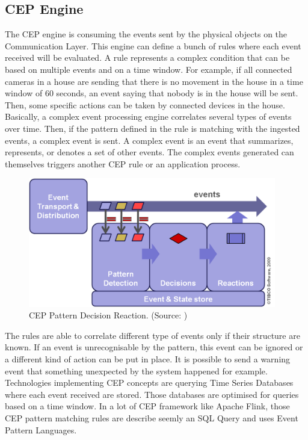 \documentclass[11pt]{article}
\begin{document}
\subsection{CEP Engine} \label{cep-engine}

The CEP engine is consuming the events sent by the physical objects on the Communication Layer. This engine can define a bunch of rules where each event received will be evaluated. A rule represents a complex condition that can be based on multiple events and on a time window. For example, if all connected cameras in a house are sending that there is no movement in the house in a time window of 60 seconds, an event saying that nobody is in the house will be sent. Then, some specific actions can be taken by connected devices in the house. Basically, a complex event processing engine correlates several types of events over time. Then, if the pattern defined in the rule is matching with the ingested events, a complex event is sent. A complex event is an event that summarizes, represents, or denotes a set of other events\cite{glossary}. The complex events generated can themselves triggers another CEP rule or an application process.
\newline
\begin{figure}[h]
	\includegraphics[width=\textwidth,height=160pt]{assets/cep-pattern-decision-reaction.png} 
	\caption[CEP Pattern Decision Reaction]{CEP Pattern Decision Reaction. (Source: \cite{cep-pattern-decision})}
	\label{fig:cep-pattern-decision-reaction}
\end{figure}

The rules are able to correlate different type of events only if their structure are known. If an event is unrecognisable by the pattern, this event can be ignored or a different kind of action can be put in place. It is possible to send a warning event that something unexpected by the system happened for example. 
\newline
\newline
Technologies implementing CEP concepts are querying Time Series Databases where each event received are stored. Those databases are optimised for queries based on a time window. In a lot of CEP framework like Apache Flink, those CEP pattern matching rules are describe seemly an SQL Query and uses Event Pattern Languages. 
\end{document}
